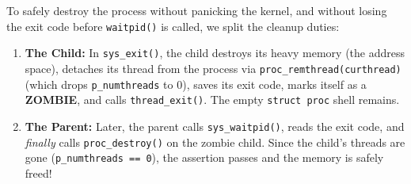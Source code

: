 To safely destroy the process without panicking the kernel, and without losing the exit code before \texttt{waitpid()} is called, we split the cleanup duties:
\begin{enumerate}
    \item \textbf{The Child:} In \texttt{sys\_exit()}, the child destroys its heavy memory (the address space), detaches its thread from the process via \texttt{proc\_remthread(curthread)} (which drops \texttt{p\_numthreads} to 0), saves its exit code, marks itself as a \textbf{ZOMBIE}, and calls \texttt{thread\_exit()}. The empty \texttt{struct proc} shell remains.
    \item \textbf{The Parent:} Later, the parent calls \texttt{sys\_waitpid()}, reads the exit code, and \textit{finally} calls \texttt{proc\_destroy()} on the zombie child. Since the child's threads are gone (\texttt{p\_numthreads == 0}), the assertion passes and the memory is safely freed!
\end{enumerate}

